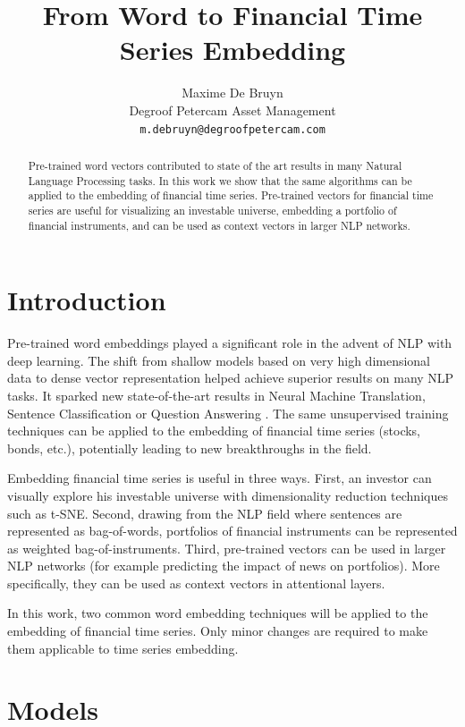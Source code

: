 \documentclass[a4paper, 11pt]{article}
\title{From Word to Financial Time Series Embedding}
\author{
  Maxime De Bruyn \\
  Degroof Petercam Asset Management \\
  \texttt{m.debruyn@degroofpetercam.com} \\
}
\begin{document}
\maketitle

\begin{abstract}
Pre-trained word vectors contributed to state of the art results in many Natural Language Processing tasks. In this work we show that the same algorithms can be applied to the embedding of financial time series.
Pre-trained vectors for financial time series are useful for visualizing an investable universe, embedding a portfolio of financial instruments, and can be used as context vectors in larger NLP networks. 
\end{abstract}

\section{Introduction}

Pre-trained word embeddings played a significant role in the advent of NLP with deep learning. The shift from shallow models based on very high dimensional data to dense vector representation helped achieve superior results on many NLP tasks. It sparked new state-of-the-art results in Neural Machine Translation, Sentence Classification or Question Answering \cite{DBLP:journals/corr/abs-1708-02709}. The same unsupervised training techniques can be applied to the embedding of financial time series (stocks, bonds, etc.), potentially leading to new breakthroughs in the field. 

Embedding financial time series is useful in three ways. First, an investor can visually explore his investable universe with dimensionality reduction techniques such as t-SNE. Second, drawing from the NLP field where sentences are represented as bag-of-words, portfolios of financial instruments can be represented as weighted bag-of-instruments. Third, pre-trained vectors can be used in larger NLP networks (for example predicting the impact of news on portfolios). More specifically, they can be used as context vectors in attentional layers.

In this work, two common word embedding techniques will be applied to the embedding of financial time series. Only minor changes are required to make them applicable to time series embedding.

\section{Models}
\end{document}
